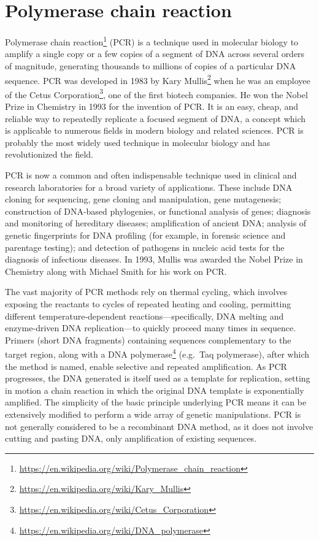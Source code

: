 \documentclass[]{book}
\let\rmarkdownfootnote\footnote%
\def\footnote{\protect\rmarkdownfootnote}
\renewcommand{\href}[2]{#2\footnote{\url{#1}}}
\begin{document}
\hypertarget{polymerase-chain-reaction}{%
\section{Polymerase chain reaction}\label{polymerase-chain-reaction}}

\href{https://en.wikipedia.org/wiki/Polymerase_chain_reaction}{Polymerase chain reaction} (PCR) is a technique used in molecular biology to amplify a single copy or a few copies of a segment of DNA across several orders of magnitude, generating thousands to millions of copies of a particular DNA sequence. PCR was developed in 1983 by \href{https://en.wikipedia.org/wiki/Kary_Mullis}{Kary Mullis} when he was an employee of the \href{https://en.wikipedia.org/wiki/Cetus_Corporation}{Cetus Corporation}, one of the first biotech companies. He won the Nobel Prize in Chemistry in 1993 for the invention of PCR. It is an easy, cheap, and reliable way to repeatedly replicate a focused segment of DNA, a concept which is applicable to numerous fields in modern biology and related sciences. PCR is probably the most widely used technique in molecular biology and has revolutionized the field.

PCR is now a common and often indispensable technique used in clinical and research laboratories for a broad variety of applications. These include DNA cloning for sequencing, gene cloning and manipulation, gene mutagenesis; construction of DNA-based phylogenies, or functional analysis of genes; diagnosis and monitoring of hereditary diseases; amplification of ancient DNA; analysis of genetic fingerprints for DNA profiling (for example, in forensic science and parentage testing); and detection of pathogens in nucleic acid tests for the diagnosis of infectious diseases. In 1993, Mullis was awarded the Nobel Prize in Chemistry along with Michael Smith for his work on PCR.

The vast majority of PCR methods rely on thermal cycling, which involves exposing the reactants to cycles of repeated heating and cooling, permitting different temperature-dependent reactions---specifically, DNA melting and enzyme-driven DNA replication---to quickly proceed many times in sequence. Primers (short DNA fragments) containing sequences complementary to the target region, along with a \href{https://en.wikipedia.org/wiki/DNA_polymerase}{DNA polymerase} (e.g.~Taq polymerase), after which the method is named, enable selective and repeated amplification. As PCR progresses, the DNA generated is itself used as a template for replication, setting in motion a chain reaction in which the original DNA template is exponentially amplified. The simplicity of the basic principle underlying PCR means it can be extensively modified to perform a wide array of genetic manipulations. PCR is not generally considered to be a recombinant DNA method, as it does not involve cutting and pasting DNA, only amplification of existing sequences.
\end{document}
